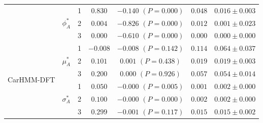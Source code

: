 \documentclass{article}
\begin{document}
\begin{center}
{\begin{tabular}{ccccccc}
                            & \multirow{3}{*}{$\phi_A^*$}   & 1                                & $0.830$                         & $-0.140$ $(P=0.000)$          & $0.048$                             & $0.016 \pm 0.003$                             \\
                            &                               & 2                                & $0.004$                         & $-0.826$ $(P=0.000)$          & $0.012$                             & $0.001 \pm 0.023$                             \\
                            &                               & 3                                & $0.000$                         & $-0.610$ $(P=0.000)$          & $0.000$                             & $0.000 \pm 0.000$                             \\ \hline
\multirow{9}{*}{CarHMM-DFT} & \multirow{3}{*}{$\mu_A^*$}    & 1                                & $-0.008$                         & $-0.008$ $(P=0.142)$          & $0.114$                             & $0.064 \pm 0.037$                             \\
                            &                               & 2                                & $0.101$                         & $0.001$ $(P=0.438)$          & $0.019$                             & $0.019 \pm 0.003$                             \\
                            &                               & 3                                & $0.200$                         & $0.000$ $(P=0.926)$          & $0.057$                             & $0.054 \pm 0.014$                             \\
                            & \multirow{3}{*}{$\sigma_A^*$} & 1                                & $0.050$                         & $-0.000$ $(P=0.005)$          & $0.001$                             & $0.002 \pm 0.000$                             \\
                            &                               & 2                                & $0.100$                         & $-0.000$ $(P=0.000)$          & $0.002$                             & $0.002 \pm 0.000$                             \\ 
                            &                               & 3                                & $0.299$                         & $-0.001$ $(P=0.117)$          & $0.015$                             & $0.015 \pm 0.002$                             \\

\end{tabular}}
\end{center}
\end{document}
